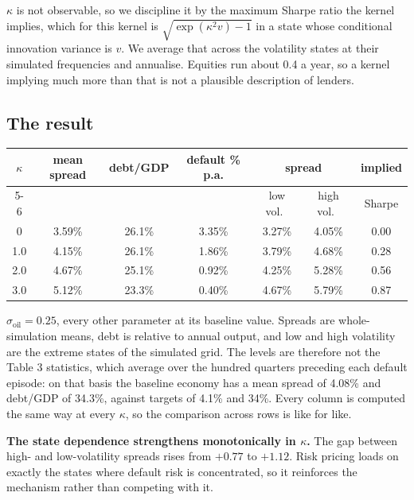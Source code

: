 $\kappa$ is not observable, so we discipline it by the maximum Sharpe ratio the
kernel implies, which for this kernel is $\sqrt{\exp(\kappa^{2}v)-1}$ in a state
whose conditional innovation variance is $v$. We average that across the
volatility states at their simulated frequencies and annualise. Equities run
about 0.4 a year, so a kernel implying much more than that is not a plausible
description of lenders.

\subsection*{The result}

\begin{table}[h]
\centering\footnotesize
\setlength{\tabcolsep}{5pt}
\begin{tabular}{ccccccc}
\toprule
$\kappa$ & mean spread & debt/GDP & default \% p.a. & \multicolumn{2}{c}{spread} & implied \\
\cmidrule(lr){5-6}
         &             &          &                 & low vol.\ & high vol.\ & Sharpe \\
\midrule
0    & 3.59\% & 26.1\% & 3.35\% & 3.27\% & 4.05\% & 0.00 \\
1.0  & 4.15\% & 26.1\% & 1.86\% & 3.79\% & 4.68\% & 0.28 \\
2.0  & 4.67\% & 25.1\% & 0.92\% & 4.25\% & 5.28\% & 0.56 \\
3.0  & 5.12\% & 23.3\% & 0.40\% & 4.67\% & 5.79\% & 0.87 \\
\bottomrule
\end{tabular}
\end{table}

\noindent
$\sigma_{\text{oil}} = 0.25$, every other parameter at its baseline value.
Spreads are whole-simulation means, debt is relative to annual output, and low
and high volatility are the extreme states of the simulated grid. The levels
are therefore not the Table 3 statistics, which average over the hundred
quarters preceding each default episode: on that basis the baseline
economy has a mean spread of 4.08\% and debt/GDP of 34.3\%, against targets of
4.1\% and 34\%. Every column is computed the same way at every $\kappa$, so the
comparison across rows is like for like.

\textbf{The state dependence strengthens monotonically in $\kappa$.} The gap
between high- and low-volatility spreads rises from $+0.77$ to $+1.12$. Risk
pricing loads on exactly the states where default risk is concentrated, so it
reinforces the mechanism rather than competing with it.

